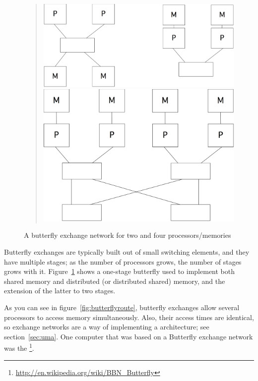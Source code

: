\begin{figure}[ht]
  \begin{quote}
    \includegraphics[scale=.06]{graphics-public/butterfly1}\hspace{.5in}
    \includegraphics[scale=.06]{graphics-public/butterfly2}
  \end{quote}
  \caption{A butterfly exchange network for two and four processors/memories}
  \label{fig:butterfly}
\end{figure}

Butterfly exchanges are typically built out of small switching
elements, and they have multiple stages; as the number of processors
grows, the number of stages grows with it. Figure~\ref{fig:butterfly}
shows a one-stage butterfly used to implement both shared memory and
distributed (or distributed shared) memory, and the extension of the
latter to two stages.

As you can see in
figure~\ref{fig:butterflyroute}, butterfly exchanges allow several processors to
access memory simultaneously. Also, their access times are identical, 
so exchange networks are a way of implementing a 
architecture; see section~\ref{sec:uma}. One computer that was based
on a Butterfly exchange network was the \footnote{\url{http://en.wikipedia.org/wiki/BBN_Butterfly}}.

